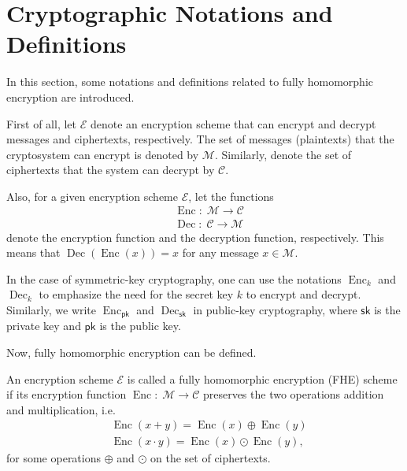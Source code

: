 


\section{Cryptographic Notations and Definitions}

In this section, some notations and definitions related to fully homomorphic encryption are introduced. %

First of all, let $\mathcal{E}$ denote an encryption scheme that can encrypt and decrypt messages and ciphertexts, respectively. The set of messages (plaintexts) that the cryptosystem can encrypt is denoted by $\mathcal{M}$. Similarly, denote the set of ciphertexts that the system can decrypt by $\mathcal{C}$.

Also, for a given encryption scheme $\mathcal{E}$, let the functions
\begin{align*} 
&\operatorname{Enc}: \; \mathcal{M} \to \mathcal{C} \\
&\operatorname{Dec}: \; \mathcal{C} \to \mathcal{M}
\end{align*}
denote the encryption function and the decryption function, respectively. This means that $\operatorname{Dec}(\operatorname{Enc}(x)) = x$ for any message $x \in \mathcal{M}$.

In the case of symmetric-key cryptography, one can use the notations $\operatorname{Enc}_k$ and $\operatorname{Dec}_k$ to emphasize the need for the secret key $k$ to encrypt and decrypt. Similarly, we write $\operatorname{Enc}_{\mathsf{pk}}$ and $\operatorname{Dec}_{\mathsf{sk}}$ in public-key cryptography, where $\mathsf{sk}$ is the private key and $\mathsf{pk}$ is the public key.

Now, fully homomorphic encryption can be defined.
\begin{definition}\label{def:fhe}
An encryption scheme $\mathcal{E}$ is called a fully homomorphic encryption (FHE) scheme if its encryption function $\operatorname{Enc}: \; \mathcal{M} \to \mathcal{C}$ preserves the two operations addition and multiplication, i.e. 
\begin{align*} 
&\operatorname{Enc}(x+y) = \operatorname{Enc}(x) \oplus \operatorname{Enc}(y) \\
&\operatorname{Enc}(x \cdot y) = \operatorname{Enc}(x) \odot \operatorname{Enc}(y),
\end{align*}
for some operations $\oplus$ and $\odot$ on the set of ciphertexts.
\end{definition}

